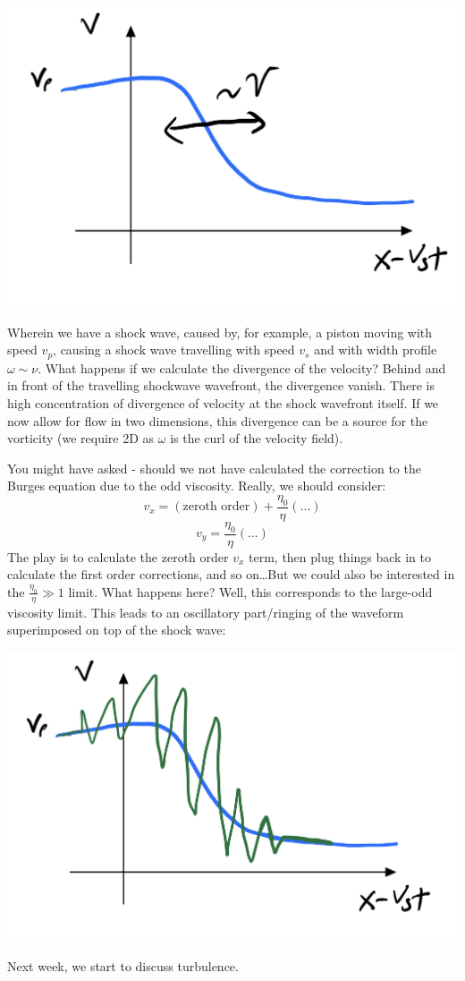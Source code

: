 \begin{center}
    \includegraphics[scale=0.35]{Lectures/Images/lec10-shockwave.png}
\end{center}

Wherein we have a shock wave, caused by, for example, a piston moving with speed $v_p$, causing a shock wave travelling with speed $v_s$ and with width profile $\omega \sim \nu$. What happens if we calculate the divergence of the velocity? Behind and in front of the travelling shockwave wavefront, the divergence vanish. There is high concentration of divergence of velocity at the shock wavefront itself. If we now allow for flow in two dimensions, this divergence can be a source for the vorticity (we require 2D as $\omega$ is the curl of the velocity field).

You might have asked - should we not have calculated the correction to the Burges equation due to the odd viscosity. Really, we should consider:
\begin{equation}
    v_x = (\text{zeroth order}) + \frac{\eta_0}{\eta}(...)
\end{equation}
\begin{equation}
    v_y = \frac{\eta_0}{\eta}(...)
\end{equation}
The play is to calculate the zeroth order $v_x$ term, then plug things back in to calculate the first order corrections, and so on\dots But we could also be interested in the $\frac{\eta_0}{\eta} \gg 1$ limit. What happens here? Well, this corresponds to the large-odd viscosity limit. This leads to an oscillatory part/ringing of the waveform superimposed on top of the shock wave:

\begin{center}
    \includegraphics[scale=0.35]{Lectures/Images/lec10-ringing.png}
\end{center}

Next week, we start to discuss turbulence.
